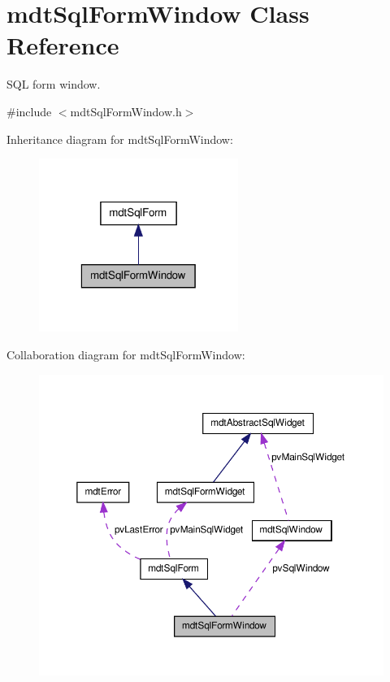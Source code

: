 \hypertarget{classmdt_sql_form_window}{
\section{mdtSqlFormWindow Class Reference}
\label{classmdt_sql_form_window}
}


SQL form window.  




{\ttfamily \#include $<$mdtSqlFormWindow.h$>$}



Inheritance diagram for mdtSqlFormWindow:\nopagebreak
\begin{figure}[H]
\begin{center}
\leavevmode
\includegraphics[width=184pt]{classmdt_sql_form_window__inherit__graph}
\end{center}
\end{figure}


Collaboration diagram for mdtSqlFormWindow:
\nopagebreak
\begin{figure}[H]
\begin{center}
\leavevmode
\includegraphics[width=360pt]{classmdt_sql_form_window__coll__graph}
\end{center}
\end{figure}
